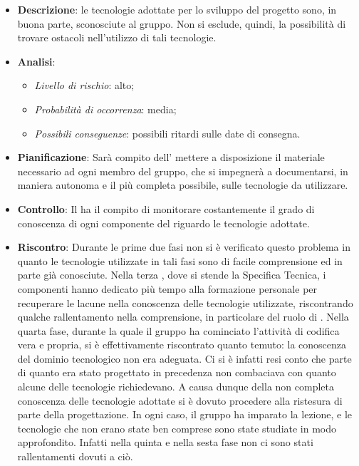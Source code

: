 			\begin{itemize}
				\item \textbf{Descrizione}: le tecnologie adottate per lo sviluppo del progetto sono, in buona parte, sconosciute al gruppo. Non si esclude, quindi, la possibilità di trovare ostacoli nell'utilizzo di tali tecnologie.
				\item \textbf{Analisi}:
					\begin{itemize}
						\item \textit{Livello di rischio}: alto;
						\item \textit{Probabilità di occorrenza}: media;
						\item \textit{Possibili conseguenze}: possibili ritardi sulle date di consegna.
					\end{itemize}
				\item \textbf{Pianificazione}: Sarà compito dell' mettere a disposizione il materiale necessario ad ogni membro del gruppo, che si impegnerà a documentarsi, in maniera autonoma e il più completa possibile, sulle tecnologie da utilizzare.
				\item \textbf{Controllo}: Il  ha il compito di monitorare costantemente il grado di conoscenza di ogni componente del  riguardo le tecnologie adottate.
				\item \textbf{Riscontro}: Durante le prime due fasi non si è verificato questo problema in quanto le tecnologie utilizzate in tali fasi sono di facile comprensione ed in parte già conosciute. Nella terza , dove si stende la Specifica Tecnica, i componenti hanno dedicato più tempo alla formazione personale per recuperare le lacune nella conoscenza delle tecnologie utilizzate, riscontrando qualche rallentamento nella comprensione, in particolare del ruolo di . Nella quarta fase, durante la quale il gruppo ha cominciato l'attività di codifica vera e propria, si è effettivamente riscontrato quanto temuto: la conoscenza del dominio tecnologico non era adeguata. Ci si è infatti resi conto che parte di quanto era stato progettato in precedenza non combaciava con quanto alcune delle tecnologie richiedevano. A causa dunque della non completa conoscenza delle tecnologie adottate si è dovuto procedere alla ristesura di parte della progettazione. In ogni caso, il gruppo ha imparato la lezione, e le tecnologie che non erano state ben comprese sono state studiate in modo approfondito. Infatti nella quinta e nella sesta fase non ci sono stati rallentamenti dovuti a ciò.
			\end{itemize}
